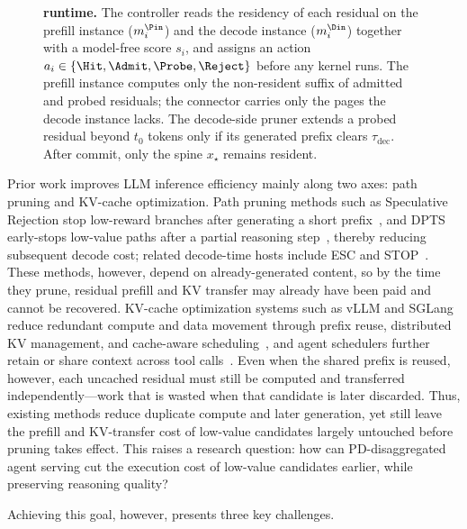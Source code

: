 \begin{figure}[t]
\centering
\resizebox{0.78\textwidth}{!}{}
\caption{\textbf{\sys{} runtime.}
The controller reads the residency of each residual on the prefill instance ($m_i^{\Pin}$) and the decode instance ($m_i^{\Din}$) together with a model-free score $s_i$, and assigns an action $a_i\in\{\Hit,\Admit,\Probe,\Reject\}$ before any kernel runs.
The prefill instance computes only the non-resident suffix of admitted and probed residuals; the connector carries only the pages the decode instance lacks.
The decode-side pruner extends a probed residual beyond $t_0$ tokens only if its generated prefix clears $\tau_{\mathrm{dec}}$.
After commit, only the spine $x_\star$ remains resident.}
\label{fig:system}
\end{figure}

Prior work improves LLM inference efficiency mainly along two axes: path pruning and KV-cache optimization.
Path pruning methods such as Speculative Rejection stop low-reward branches after generating a short prefix~\cite{specrej}, and DPTS early-stops low-value paths after a partial reasoning step~\cite{dpts}, thereby reducing subsequent decode cost; related decode-time hosts include ESC and STOP~\cite{esc,stoploss}.
These methods, however, depend on already-generated content, so by the time they prune, residual prefill and KV transfer may already have been paid and cannot be recovered.
KV-cache optimization systems such as vLLM and SGLang reduce redundant compute and data movement through prefix reuse, distributed KV management, and cache-aware scheduling~\cite{vllm,sglang}, and agent schedulers further retain or share context across tool calls~\cite{autellix,continuum,mori,conserve,forkkv}.
Even when the shared prefix is reused, however, each uncached residual must still be computed and transferred independently---work that is wasted when that candidate is later discarded.
Thus, existing methods reduce duplicate compute and later generation, yet still leave the prefill and KV-transfer cost of low-value candidates largely untouched before pruning takes effect.
This raises a research question: how can PD-disaggregated agent serving cut the execution cost of low-value candidates earlier, while preserving reasoning quality?

Achieving this goal, however, presents three key challenges.

